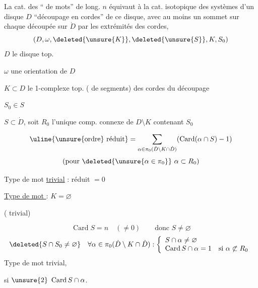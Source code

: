 La cat. des `` de mots'' de long. $n$ équivaut à la cat. isotopique des systèmes  d'un disque $D$   ``découpage en cordes'' de ce disque, avec au moins un sommet sur chaque  découpée sur $\dot D$ par les extrémités des cordes,
\[
(D,\omega,\deleted{\unsure{K}},\deleted{\unsure{S}},K,S_0)
\]
$D$ le disque top.\par
$\omega$ une orientation de $D$\par
$K\subset D$ le 1-complexe top. (  de segments) des cordes du découpage\par
$S_0\in S$ \par
$S\subset\dot D$, soit $R_0$ l'unique comp. connexe de $D\setminus K$ contenant $S_0$

\[
\uline{\text{\unsure{ordre} réduit}}=\sum_{\alpha\in\pi_0(\dot D\setminus K\cap\dot D)}(\operatorname{Card}(\alpha\cap S)-1)
\]
\[
(\text{pour }\deleted{\unsure{\alpha\in\pi_0}}\ \alpha\subset R_0)
\]

Type de mot \uline{trivial} :  réduit $=0$\par
\uline{Type de mot } : $K=\varnothing$\par
( trivial)

\[
\operatorname{Card}S=n\quad(\ne0)\qquad\text{donc }S\ne\varnothing
\]
\[
\deleted{S\cap S_0\ne\varnothing}\quad
\forall\alpha\in\pi_0(\dot D\setminus K\cap\dot D):
\left\{\begin{array}{l}
S\cap\alpha\ne\varnothing\\
\operatorname{Card}S\cap\alpha=1\quad\text{si }\alpha\not\subset R_0
\end{array}\right.
\]
Type de mot trivial,\par
si $\unsure{2}\ \operatorname{Card}S\cap\alpha$.


